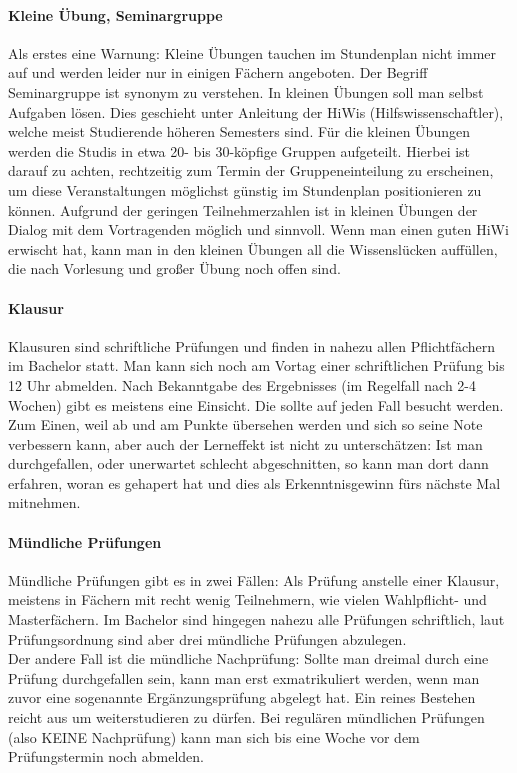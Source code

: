\begin{multicols}{2}
	\paragraph*{Kleine Übung, Seminargruppe}
	Als erstes eine Warnung: Kleine Übungen tauchen im Stundenplan nicht immer auf und werden leider nur in einigen Fächern angeboten. Der Begriff Seminargruppe ist synonym zu verstehen.
	In kleinen Übungen soll man selbst Aufgaben lösen. Dies geschieht unter Anleitung der HiWis (Hilfswissenschaftler), welche meist Studierende höheren Semesters sind. Für die kleinen Übungen werden die Studis in etwa 20- bis 30-köpfige Gruppen aufgeteilt. Hierbei ist darauf zu achten, rechtzeitig zum Termin der Gruppeneinteilung zu erscheinen, um diese Veranstaltungen möglichst günstig im Stundenplan positionieren zu können. Aufgrund der geringen Teilnehmerzahlen ist in kleinen Übungen der Dialog mit dem Vortragenden möglich und sinnvoll. Wenn man einen guten HiWi erwischt hat, kann man in den kleinen Übungen all die Wissenslücken auffüllen, die nach Vorlesung und großer Übung noch offen sind.
	
	\paragraph*{Klausur}
	Klausuren sind schriftliche Prüfungen und finden in nahezu allen Pflichtfächern im Bachelor statt. Man kann sich noch am Vortag einer schriftlichen Prüfung bis 12 Uhr abmelden. Nach Bekanntgabe des Ergebnisses (im Regelfall nach 2-4 Wochen) gibt es meistens eine Einsicht. Die sollte auf jeden Fall besucht werden. Zum Einen, weil ab und am Punkte übersehen werden und sich so seine Note verbessern kann, aber auch der Lerneffekt ist nicht zu unterschätzen: Ist man durchgefallen, oder unerwartet schlecht abgeschnitten, so kann man dort dann erfahren, woran es gehapert hat und dies als Erkenntnisgewinn fürs nächste Mal mitnehmen.

	\paragraph*{Mündliche Prüfungen}
	Mündliche Prüfungen gibt es in zwei Fällen: Als Prüfung anstelle einer Klausur, meistens in Fächern mit recht wenig Teilnehmern, wie vielen Wahlpflicht- und Masterfächern. 
	Im Bachelor sind hingegen nahezu alle Prüfungen schriftlich, laut Prüfungsordnung sind aber drei mündliche Prüfungen abzulegen. \\
	Der andere Fall ist die mündliche Nachprüfung: Sollte man dreimal durch eine Prüfung durchgefallen sein, kann man erst exmatrikuliert werden, wenn man zuvor eine sogenannte Ergänzungsprüfung abgelegt hat. Ein reines Bestehen reicht aus um weiterstudieren zu dürfen.
	Bei regulären mündlichen Prüfungen (also KEINE Nachprüfung) kann man sich bis eine Woche vor dem Prüfungstermin noch abmelden.


\end{multicols}
